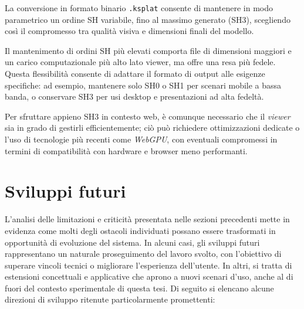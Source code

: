La conversione in formato binario \texttt{.ksplat} consente di mantenere in modo parametrico un ordine SH variabile, fino al massimo generato (SH3), scegliendo così il compromesso tra qualità visiva e dimensioni finali del modello.  

Il mantenimento di ordini SH più elevati comporta file di dimensioni maggiori e un carico computazionale più alto lato viewer, ma offre una resa più fedele.  
Questa flessibilità consente di adattare il formato di output alle esigenze specifiche: ad esempio, mantenere solo SH0 o SH1 per scenari mobile a bassa banda, o conservare SH3 per usi desktop e presentazioni ad alta fedeltà.

Per sfruttare appieno SH3 in contesto web, è comunque necessario che il \emph{viewer} sia in grado di gestirli efficientemente; ciò può richiedere ottimizzazioni dedicate o l'uso di tecnologie più recenti come \emph{WebGPU}, con eventuali compromessi in termini di compatibilità con hardware e browser meno performanti.


\section{Sviluppi futuri}
L'analisi delle limitazioni e criticità presentata nelle sezioni precedenti mette in evidenza come molti degli ostacoli individuati possano essere trasformati in opportunità di evoluzione del sistema.  
In alcuni casi, gli sviluppi futuri rappresentano un naturale proseguimento del lavoro svolto, con l'obiettivo di superare vincoli tecnici o migliorare l'esperienza dell'utente.  
In altri, si tratta di estensioni concettuali e applicative che aprono a nuovi scenari d'uso, anche al di fuori del contesto sperimentale di questa tesi.  
Di seguito si elencano alcune direzioni di sviluppo ritenute particolarmente promettenti:

